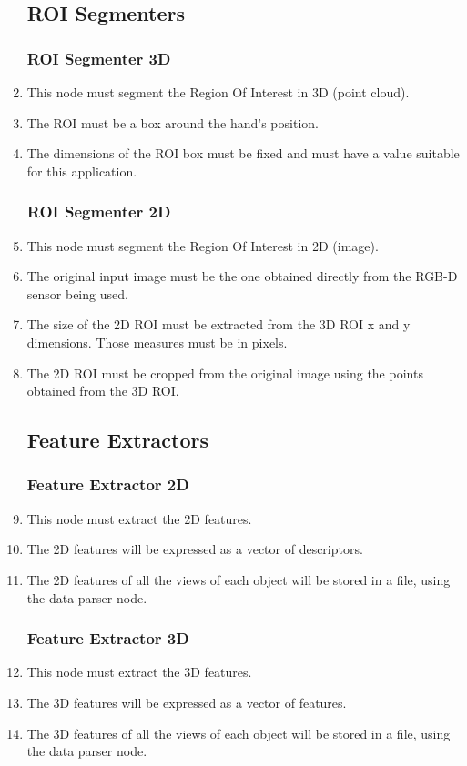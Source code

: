 \documentclass{article}
\makeatletter
\def\threedigits#1{\expandafter\@threedigits\csname c@#1\endcsname}
\def\@threedigits#1{%
  \ifnum#1<100 0\fi
  \ifnum#1<10 0\fi
  \number#1}
\makeatother
\begin{document}
\begin{enumerate}[label=\textbf{FR\threedigits*}, leftmargin=2cm]
\subsection{ROI Segmenters}

   \subsubsection{ROI Segmenter 3D}
	\item This node must segment the Region Of Interest in 3D (point cloud). 
	\item The ROI must be a box around the hand's position. 
	\item The dimensions of the ROI box must be fixed and must have a value suitable for this application.  
   \subsubsection{ROI Segmenter 2D}
   	\item This node must segment the Region Of Interest in 2D (image).
   	\item The original input image must be the one obtained directly from the RGB-D sensor being used.
   	\item The size of the 2D ROI must be extracted from the 3D ROI x and y dimensions. Those measures must be in pixels. 
	\item The 2D ROI must be cropped from the original image using the points obtained from the 3D ROI. 

\subsection{Feature Extractors}
   \subsubsection{Feature Extractor 2D}
	\item This node must extract the 2D features. 
	\item The 2D features will be expressed as a vector of descriptors. %
	\item The 2D features of all the views of each object will be stored in a file, using the data parser node.  
  
  \subsubsection{Feature Extractor 3D}
   	\item This node must extract the 3D features. 
	\item The 3D features will be expressed as a vector of features. %
	\item The 3D features of all the views of each object will be stored in a file, using the data parser node.  


\end{enumerate}
\end{document}
